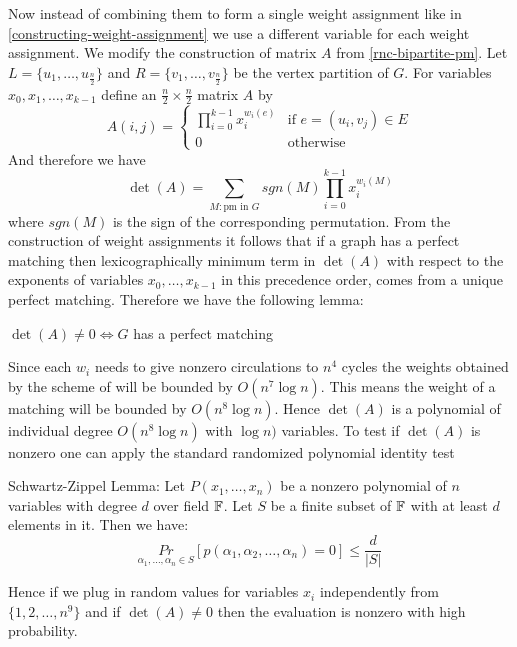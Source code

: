 Now instead of combining them to form a single weight assignment like in \autoref{constructing-weight-assignment} we use a different variable for each weight assignment. We modify the construction of matrix $A$ from \autoref{rnc-bipartite-pm}. Let $L=\{u_1,\dots, u_{\frac{n}2}\}$ and $R=\{v_1,\dots, v_{\frac{n}2}\}$ be the vertex partition of $G$. For variables $x_0,x_1,\dots, x_{k-1}$ define an $\frac{n}2\times \frac{n}2$ matrix $A$ by \[
	 A(i,j)=\begin{cases}
		\prod\limits_{i=0}^{k-1} x_i^{w_i(e)} & \text{if $e=(u_i,v_j)\in E$}\\ 
		0 & \text{otherwise}
	 \end{cases}
\]
And therefore we have $$\det(A)=\sum\limits_{M: \text{pm in $G$}}^{} sgn(M)\prod\limits_{i=0}^{k-1} x_i^{w_i(M)}  $$ where $sgn(M)$ is the sign of the corresponding permutation. From the construction of weight assignments it follows that if a graph has a perfect matching then lexicographically minimum term in $\det(A)$ with respect to the exponents of variables $x_0,\dots, x_{k-1}$ in this precedence order, comes from a unique perfect matching. Therefore we have the following lemma:
\begin{lemma}{}{}
	$\det(A)\neq 0\iff G$ has a perfect matching
\end{lemma}

Since each $w_i$ needs to give nonzero circulations to $n^4	$ cycles the weights obtained by the scheme of  will be bounded by $O(n^7\log n)$. This means the weight of a matching will be bounded by $O(n^8\log n)$. Hence $\det(A)$ is a polynomial of individual degree $O(n^8\log n)$ with $\log n)$ variables. To test if $\det(A)$ is nonzero one can apply the standard randomized polynomial identity test
\begin{Theorem}{Schwartz-Zippel Lemma: \cite{Schwartz_1980_FPA,Zippel_1979}}{}
Let $P(x_1,\dots, x_n)$ be a nonzero polynomial of $n$ variables with degree $d$ over field $\mathbb{F}$.  Let $S$ be a finite subset of $\mathbb{F}$  with at least $d$ elements in it. Then we have: \[
\underset{\alpha_1,\dots, \alpha_n\in S}{Pr}[{p(\alpha_1,\alpha_2,\dots,\alpha_n)=0}]\leq \frac{d}{|S|}
\]
\end{Theorem}
Hence if we plug in random values for variables $x_i$ independently from $\{1,2,\dots, n^9\}$ and if $\det(A)\neq 0$ then the evaluation is nonzero with high probability.\parinf\vspace{2mm}

